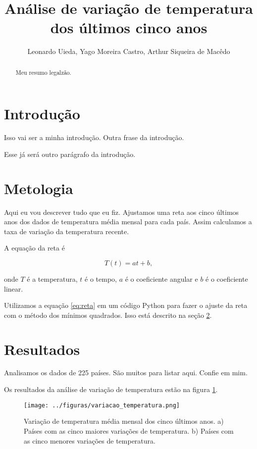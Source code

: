 \documentclass{article}
\begin{document}
\title{Análise de variação de temperatura dos últimos cinco anos}
\author{Leonardo Uieda, Yago Moreira Castro, Arthur Siqueira de Macêdo}

\maketitle

\begin{abstract}
Meu resumo legalzão.
\end{abstract}

\section{Introdução}

Isso vai ser a minha introdução.
Outra frase da introdução.

Esse já será outro parágrafo da introdução.

\section{Metologia}
\label{sec:metodos}

Aqui eu vou descrever tudo que eu fiz.
Ajustamos uma reta aos cinco últimos anos dos dados
de temperatura média mensal para cada país.
Assim calculamos a taxa de variação da temperatura recente.

A equação da reta é

\begin{equation}
T(t) = a t + b,
\label{eq:reta}
\end{equation}

\noindent
onde $T$ é a temperatura, $t$ é o tempo, $a$ é o coeficiente angular 
e $b$ é o coeficiente linear.

Utilizamos a equação \ref{eq:reta} em um código Python para fazer o ajuste da 
reta com o método dos mínimos quadrados. 
Isso está descrito na seção \ref{sec:metodos}.

\section{Resultados}

Analisamos os dados de 225 países. São muitos para listar aqui. Confie em mim.

Os resultados da análise de variação de temperatura estão na figura \ref{fig:variacao}.

\begin{figure}[!tb]
    \centering
    \texttt{[image: ../figuras/variacao\_temperatura.png]}
    \caption{
        Variação de temperatura média mensal dos cinco últimos anos. 
        a) Países com as cinco maiores variações de temperatura.
        b) Países com as cinco menores variações de temperatura.
    }
    \label{fig:variacao}
\end{figure}
\end{document}
